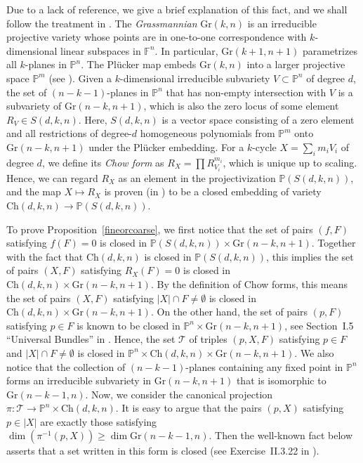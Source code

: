 \documentclass[11pt]{article}
\theoremstyle{definition}
\begin{document}
Due to a lack of reference, we give a brief explanation of this fact, and we shall follow the treatment in \cite{gelfand1994discriminants}. The \textit{Grassmannian} $\text{Gr}(k,n)$ is an irreducible projective variety whose points are in one-to-one correspondence with $k$-dimensional linear subspaces in $\mathbb{F}^n$. In particular, $\text{Gr}(k+1,n+1)$ parametrizes all $k$-planes in $\mathbb{P}^n$. The Pl\"ucker map embeds $\text{Gr}(k,n)$ into a larger projective space $\mathbb{P}^m$ (see \cite{griffiths2014principles}). Given a $k$-dimensional irreducible subvariety $V \subset \mathbb{P}^n$ of degree $d$, the set of $(n-k-1)$-planes in $\mathbb{P}^n$ that has non-empty intersection with $V$ is a subvariety of $\text{Gr}(n-k,n+1)$, which is also the zero locus of some element $R_V \in S(d,k,n)$. Here, $S(d,k,n)$ is a vector space consisting of a zero element and all restrictions of degree-$d$ homogeneous polynomials from $\mathbb{P}^m$ onto $\text{Gr}(n-k,n+1)$ under the Pl\"ucker embedding. For a $k$-cycle $X = \sum_i m_iV_i$ of degree $d$, we define its \textit{Chow form} as $R_X = \prod R_{V_i}^{m_i}$, which is unique up to scaling. Hence, we can regard $R_X$ as an element in the projectivization $\mathbb{P}(S(d,k,n))$, and the map $X \mapsto R_X$ is proven (in \cite{chow1937algebraischen}) to be a closed embedding of variety $\text{Ch}(d,k,n) \to \mathbb{P}(S(d,k,n))$.

To prove Proposition~\ref{fineorcoarse}, we first notice that the set of pairs $(f,F)$ satisfying $f(F) = 0$ is closed in $\mathbb{P}(S(d,k,n)) \times \text{Gr}(n-k,n+1)$. Together with the fact that $\text{Ch}(d,k,n)$ is closed in $\mathbb{P}(S(d,k,n))$, this implies the set of pairs $(X,F)$ satisfying $R_X(F) = 0$ is closed in $\text{Ch}(d,k,n) \times \text{Gr}(n-k,n+1)$. By the definition of Chow forms, this means the set of pairs $(X,F)$ satisfying $|X| \cap F \neq \emptyset$ is closed in $\text{Ch}(d,k,n) \times \text{Gr}(n-k,n+1)$. On the other hand, the set of pairs $(p,F)$ satisfying $p \in F$ is known to be closed in $\mathbb{P}^n \times \text{Gr}(n-k,n+1)$, see Section~I.5 ``Universal Bundles'' in \cite{griffiths2014principles}. Hence, the set $\mathcal{T}$ of triples $(p,X,F)$ satisfying $p\in F$ and $|X| \cap F \neq \emptyset$ is closed in $\mathbb{P}^n \times \text{Ch}(d,k,n) \times \text{Gr}(n-k,n+1)$. We also notice that the collection of $(n-k-1)$-planes containing any fixed point in $\mathbb{P}^n$ forms an irreducible subvariety in $\text{Gr}(n-k,n+1)$ that is isomorphic to $\text{Gr}(n-k-1,n)$. Now, we consider the canonical projection $\pi: \mathcal{T} \to \mathbb{P}^n \times \text{Ch}(d,k,n)$. It is easy to argue that the pairs $(p,X)$ satisfying $p \in |X|$ are exactly those satisfying $\dim\left( \pi^{-1}(p,X) \right) \geq \dim \text{Gr}(n-k-1,n)$. Then the well-known fact below asserts that a set written in this form is closed (see Exercise~II.3.22 in \cite{hartshorne}). %
\end{document}

